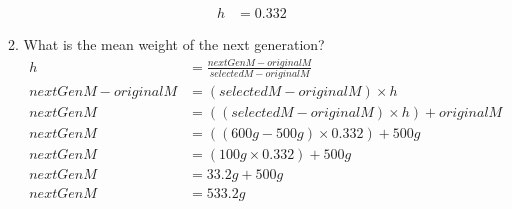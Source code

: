 \documentclass[12pt,a4paper]{paper}
\begin{document}
\begin{enumerate}
\begin{enumerate}
\begin{equation*}
\begin{split}
h &= 0.332
\end{split}
\end{equation*}
\item What is the mean weight of the next generation?
\begin{equation*}
\begin{split}
h &= \frac{nextGenM - originalM}{selectedM - originalM}\\
nextGenM - originalM &= (selectedM - originalM) \times h\\
nextGenM &= ((selectedM - originalM) \times h) + originalM\\
nextGenM &= ((600 g - 500 g) \times 0.332) + 500 g\\
nextGenM & = (100g \times 0.332) + 500 g\\
nextGenM &= 33.2g + 500 g\\
nextGenM &= 533.2 g\\
\end{split}
\end{equation*}
\end{enumerate}
\end{enumerate}
\end{document}
